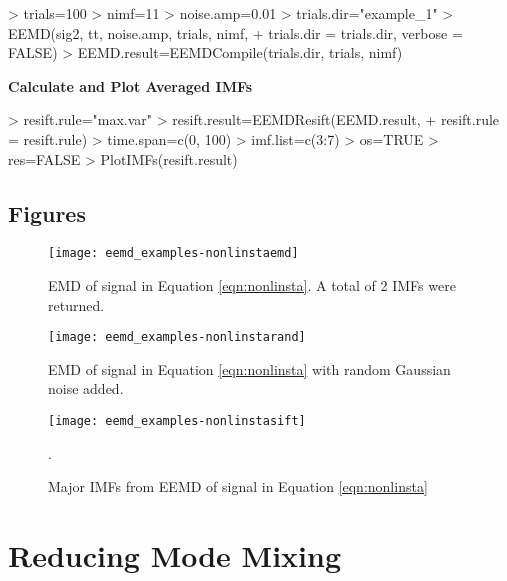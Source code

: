 \documentclass[12pt]{article}
\begin{document}
\begin{Schunk}
\begin{Sinput}
> trials=100
> nimf=11
> noise.amp=0.01
> trials.dir="example_1"
> EEMD(sig2, tt, noise.amp, trials, nimf, 
+     trials.dir = trials.dir, verbose = FALSE)
> EEMD.result=EEMDCompile(trials.dir, trials, nimf)
\end{Sinput}
\end{Schunk}

\textbf{Calculate and Plot Averaged IMFs}

\begin{Schunk}
\begin{Sinput}
> resift.rule="max.var"
> resift.result=EEMDResift(EEMD.result, 
+ resift.rule = resift.rule)
> time.span=c(0, 100)
> imf.list=c(3:7)
> os=TRUE
> res=FALSE
> PlotIMFs(resift.result)
\end{Sinput}
\end{Schunk}

\subsection{Figures}

\FloatBarrier

\begin{figure}[ht]
\begin{center}
\texttt{[image: eemd\_examples-nonlinstaemd]}
\end{center}
\caption{EMD of signal in Equation \ref{eqn:nonlinsta}.
A total of 2 IMFs were returned.}
\label{fig:nonlinstaemd}
\end{figure}

\begin{figure}[ht]
\begin{center}
\texttt{[image: eemd\_examples-nonlinstarand]}
\end{center}
\caption{EMD of signal in Equation \ref{eqn:nonlinsta} with random Gaussian noise added.}
\label{fig:nonlinstarand}
\end{figure}

\begin{figure}[ht]
\begin{center}
\texttt{[image: eemd\_examples-nonlinstasift]}
\end{center}
\caption{Major IMFs from EEMD of signal in Equation \ref{eqn:nonlinsta}}.
\label{fig:nonlinstasift}
\end{figure}

\FloatBarrier

\section{Reducing Mode Mixing}
\end{document}

